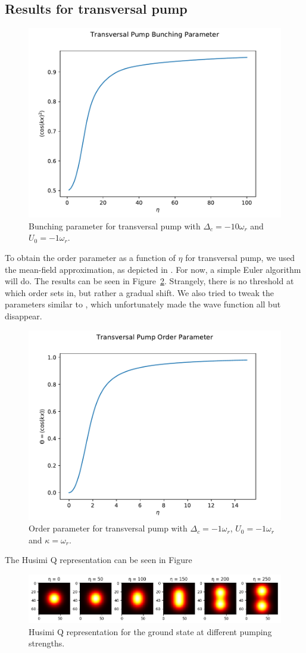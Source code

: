 \subsection{Results for transversal pump}

\begin{figure}[ht]
  \centering
  \includegraphics[width=.7\linewidth]{images/trans_pmp_bunch.pdf}
  \caption{Bunching parameter for transversal pump with $\Delta_c = -10 \omega_r$ and $U_0 = -1 \omega_r$.}
  \label{trans_pmp_bunch}
\end{figure}
\FloatBarrier

\noindent To obtain the order parameter as a function of $\eta$ for transversal pump, we used the mean-field approximation, as depicted in \cite{cold_atoms}. For now, a simple Euler algorithm will do. The results can be seen in Figure~\ref{trans_pmp_order}. Strangely, there is no threshold at which order sets in, but rather a gradual shift. We also tried to tweak the parameters similar to \cite{Nagy2008}, which unfortunately made the wave function all but disappear.

\begin{figure}[ht]
  \centering
  \includegraphics[width=.7\linewidth]{images/trans_pmp_order.pdf}
  \caption{Order parameter for transversal pump with $\Delta_c = -1 \omega_r$, $U_0 = -1 \omega_r$ and $\kappa = \omega_r$.}
  \label{trans_pmp_order}
\end{figure}
\FloatBarrier

\noindent The Husimi Q representation can be seen in Figure

\begin{figure}[ht]
  \centering
  \includegraphics[width=.9\linewidth]{images/trans_qfunc.png}
  \caption{Husimi Q representation for the ground state at different pumping strengths.}
  \label{fig:trans_qfunc}
\end{figure}
\FloatBarrier
